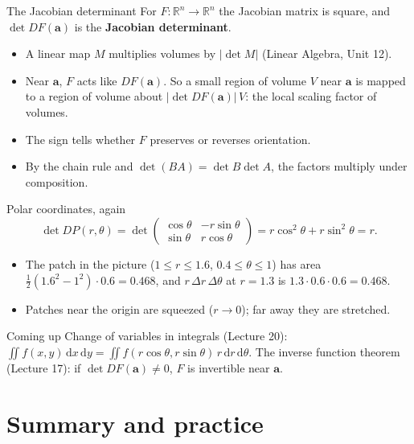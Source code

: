 \documentclass[10pt]{wosm-slides}
\newcommand{\R}{\mathbb{R}}
\newcommand{\va}{\mathbf{a}}
\begin{document}
\begin{frame}{The Jacobian determinant}
  For $F\colon \R^n \to \R^n$ the Jacobian matrix is square, and $\det DF(\va)$ is the
  \textbf{Jacobian determinant}.
  \pause
  \begin{itemize}
    \item A linear map $M$ multiplies volumes by $|\det M|$ (Linear Algebra, Unit 12).
    \item Near $\va$, $F$ acts like $DF(\va)$. So a small region of volume $V$ near $\va$ is mapped to
      a region of volume about $|\det DF(\va)|\, V$: the local scaling factor of volumes.
    \item The sign tells whether $F$ preserves or reverses orientation.
    \item By the chain rule and $\det(BA) = \det B \det A$, the factors multiply under composition.
  \end{itemize}
\end{frame}

\begin{frame}{Polar coordinates, again}
  \[ \det DP(r, \theta) = \det \begin{pmatrix} \cos\theta & -r\sin\theta \\ \sin\theta & r\cos\theta \end{pmatrix}
     = r\cos^2\theta + r\sin^2\theta = r . \]
  \pause
  \begin{itemize}
    \item The patch in the picture ($1 \le r \le 1.6$, $0.4 \le \theta \le 1$) has area
      $\frac12(1.6^2 - 1^2) \cdot 0.6 = 0.468$, and $r\,\Delta r\,\Delta\theta$ at $r = 1.3$ is
      $1.3 \cdot 0.6 \cdot 0.6 = 0.468$.
    \item Patches near the origin are squeezed ($r \to 0$); far away they are stretched.
  \end{itemize}
  \pause
  \begin{block}{Coming up}
    Change of variables in integrals (Lecture 20):
    $\iint f(x, y)\,\mathrm dx\,\mathrm dy = \iint f(r\cos\theta, r\sin\theta)\, r\,\mathrm dr\,\mathrm d\theta$.
    The inverse function theorem (Lecture 17): if $\det DF(\va) \ne 0$, $F$ is invertible near $\va$.
  \end{block}
\end{frame}

\section{Summary and practice}
\end{document}
